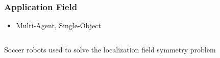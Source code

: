 \begin{frame}
	\frametitle{Application Field}
	
	\vspace{0.24cm}
	
	\begin{itemize}
		\item Multi-Agent, Single-Object
	\end{itemize}
	
	\vspace{-0.45cm}
	
	\begin{columns}[t]
		{
			
			\begin{block}{Soccer robots}
				used to solve the localization field symmetry problem
			\end{block}
			
		}
	\end{columns}
	
	\centering
	\vspace{0.3cm}
	
	
\end{frame}

